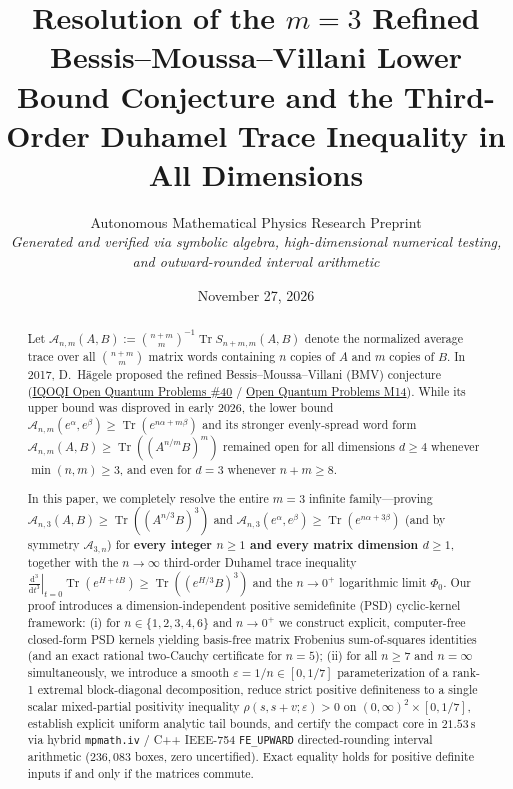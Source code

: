 \documentclass[11pt,a4paper]{article}
\title{\textbf{\color{primary}Resolution of the $m=3$ Refined Bessis--Moussa--Villani Lower Bound Conjecture and the Third-Order Duhamel Trace Inequality in All Dimensions}}
\author{Autonomous Mathematical Physics Research Preprint\\
\small\textit{Generated and verified via symbolic algebra, high-dimensional numerical testing, and outward-rounded interval arithmetic}}
\date{November 27, 2026}
\theoremstyle{remark}
\newcommand{\Tr}{\operatorname{Tr}}
\begin{document}
\maketitle

\begin{abstract}
Let $\mathcal{A}_{n,m}(A,B) := \binom{n+m}{m}^{-1}\Tr S_{n+m,m}(A,B)$ denote the normalized average trace over all $\binom{n+m}{m}$ matrix words containing $n$ copies of $A$ and $m$ copies of $B$. In 2017, D.~H\"agele proposed the refined Bessis--Moussa--Villani (BMV) conjecture (\href{https://oqp.iqoqi.oeaw.ac.at/open-quantum-problems}{IQOQI Open Quantum Problems \#40} / \href{https://openquantumproblems.com/p/M14}{Open Quantum Problems M14}). While its upper bound was disproved in early 2026, the lower bound $\mathcal{A}_{n,m}(e^\alpha,e^\beta)\ge\Tr(e^{n\alpha+m\beta})$ and its stronger evenly-spread word form $\mathcal{A}_{n,m}(A,B)\ge\Tr((A^{n/m}B)^m)$ remained open for all dimensions $d\ge 4$ whenever $\min(n,m)\ge 3$, and even for $d=3$ whenever $n+m\ge 8$.

In this paper, we completely resolve the entire $m=3$ infinite family---proving $\mathcal{A}_{n,3}(A,B)\ge\Tr((A^{n/3}B)^3)$ and $\mathcal{A}_{n,3}(e^\alpha,e^\beta)\ge\Tr(e^{n\alpha+3\beta})$ (and by symmetry $\mathcal{A}_{3,n}$) for \textbf{every integer $n\ge 1$ and every matrix dimension $d\ge 1$}, together with the $n\to\infty$ third-order Duhamel trace inequality $\left.\frac{\mathrm{d}^3}{\mathrm{d}t^3}\right|_{t=0}\Tr(e^{H+tB})\ge\Tr((e^{H/3}B)^3)$ and the $n\to 0^+$ logarithmic limit $\Phi_0$. Our proof introduces a dimension-independent positive semidefinite (PSD) cyclic-kernel framework:
(i) for $n\in\{1,2,3,4,6\}$ and $n\to 0^+$ we construct explicit, computer-free closed-form PSD kernels yielding basis-free matrix Frobenius sum-of-squares identities (and an exact rational two-Cauchy certificate for $n=5$);
(ii) for all $n\ge 7$ and $n=\infty$ simultaneously, we introduce a smooth $\varepsilon=1/n\in[0,1/7]$ parameterization of a rank-1 extremal block-diagonal decomposition, reduce strict positive definiteness to a single scalar mixed-partial positivity inequality $\rho(s,s+v;\varepsilon)>0$ on $(0,\infty)^2\times[0,1/7]$, establish explicit uniform analytic tail bounds, and certify the compact core in $21.53\,\mathrm{s}$ via hybrid \texttt{mpmath.iv} / C++ IEEE-754 \texttt{FE\_UPWARD} directed-rounding interval arithmetic ($236{,}083$ boxes, zero uncertified). Exact equality holds for positive definite inputs if and only if the matrices commute.
\end{abstract}
\end{document}
